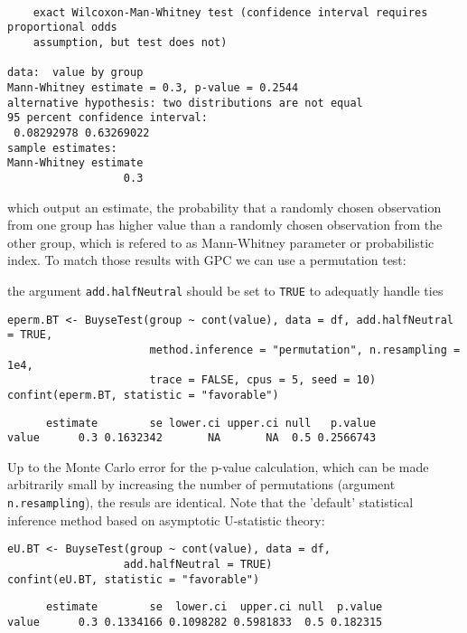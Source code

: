 \documentclass[12pt]{article}
\newcommand\Warning[1][3ex]{%
\renewcommand\stacktype{L}%
\scaleto{\stackon[1.3pt]{\color{red}$\triangle$}{\tiny\bfseries !}}{#1}%
\xspace
}
\begin{document}
\begin{verbatim}

	exact Wilcoxon-Man-Whitney test (confidence interval requires proportional odds
	assumption, but test does not)

data:  value by group
Mann-Whitney estimate = 0.3, p-value = 0.2544
alternative hypothesis: two distributions are not equal
95 percent confidence interval:
 0.08292978 0.63269022
sample estimates:
Mann-Whitney estimate 
                  0.3
\end{verbatim}

\noindent which output an estimate, the probability that a randomly
chosen observation from one group has higher value than a randomly
chosen observation from the other group, which is refered to as
Mann-Whitney parameter or probabilistic index. To match those results
with GPC we can use a permutation test: \newline \Warning the argument
\texttt{add.halfNeutral} should be set to \texttt{TRUE} to adequatly handle ties
\lstset{language=r,label= ,caption= ,captionpos=b,numbers=none}
\begin{lstlisting}
eperm.BT <- BuyseTest(group ~ cont(value), data = df, add.halfNeutral = TRUE,
                      method.inference = "permutation", n.resampling = 1e4,
                      trace = FALSE, cpus = 5, seed = 10)
confint(eperm.BT, statistic = "favorable")
\end{lstlisting}

\begin{verbatim}
      estimate        se lower.ci upper.ci null   p.value
value      0.3 0.1632342       NA       NA  0.5 0.2566743
\end{verbatim}


Up to the Monte Carlo error for the p-value calculation, which can be
made arbitrarily small by increasing the number of permutations
(argument \texttt{n.resampling}), the resuls are identical. Note that the
'default' statistical inference method based on asymptotic
U-statistic theory:
\lstset{language=r,label= ,caption= ,captionpos=b,numbers=none}
\begin{lstlisting}
eU.BT <- BuyseTest(group ~ cont(value), data = df,
                  add.halfNeutral = TRUE)
confint(eU.BT, statistic = "favorable")
\end{lstlisting}

\begin{verbatim}
      estimate        se  lower.ci  upper.ci null  p.value
value      0.3 0.1334166 0.1098282 0.5981833  0.5 0.182315
\end{verbatim}
\end{document}
